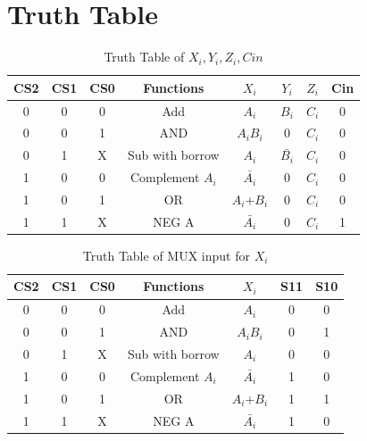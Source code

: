 \documentclass[11pt]{article}
\begin{document}
\section{Truth Table}
\begin{table}[ht]
    \centering
    \begin{tabular}{|c|c|c|c|c|c|c|c|}
        \hline
        CS2 & CS1 & CS0 & Functions & $X_i$ & $Y_i$ & $Z_i$ & Cin \\
        \hline
        0 & 0 & 0 & Add & $A_i$ & $B_i$ & $C_i$ & 0 \\
        \hline
        0 & 0 & 1 & AND & $A_iB_i$ & 0 & $C_i$ & 0 \\
        \hline
        0 & 1 & X & Sub with borrow & $A_i$ & $\bar{B_i}$ & $C_i$ & 0 \\
        \hline
        1 & 0 & 0 & Complement $A_i$ & $\bar{A_i}$ & 0 & $C_i$ & 0 \\
        \hline
        1 & 0 & 1 & OR & $A_i$+$B_i$ & 0 & $C_i$ & 0 \\
        \hline
        1 & 1 & X & NEG A & $\bar{A_i}$ & 0 & $C_i$ & 1 \\
        \hline
    \end{tabular}
    \caption{Truth Table of $X_i, Y_i, Z_i, Cin$}
\end{table}

\begin{table}[ht]
    \centering
    \begin{tabular}{|c|c|c|c|c|c|c|}
        \hline
        CS2 & CS1 & CS0 & Functions & $X_i$ & S11 & S10 \\
        \hline
        0 & 0 & 0 & Add & $A_i$ & 0 & 0 \\
        \hline
        0 & 0 & 1 & AND & $A_iB_i$ & 0 & 1 \\
        \hline
        0 & 1 & X & Sub with borrow & $A_i$ & 0 & 0 \\
        \hline
        1 & 0 & 0 & Complement $A_i$ & $\bar{A_i}$ & 1 & 0 \\
        \hline
        1 & 0 & 1 & OR & $A_i$+$B_i$ & 1 & 1 \\
        \hline
        1 & 1 & X & NEG A & $\bar{A_i}$ & 1 & 0 \\
        \hline
    \end{tabular}
    \caption{Truth Table of MUX input for $X_i$}
\end{table}
\end{document}
